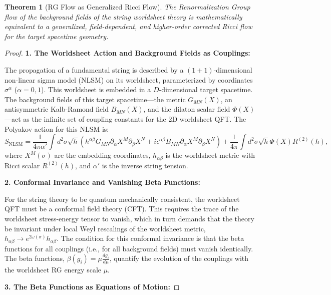 \documentclass[11pt, letterpaper]{report}
\theoremstyle{plain} %
\newtheorem{theorem}{Theorem}[chapter]
\theoremstyle{definition} %
\theoremstyle{remark} %
\begin{document}
\begin{theorem}[RG Flow as Generalized Ricci Flow]
\label{thm:rg_as_ricci}
The Renormalization Group flow of the background fields of the string worldsheet theory is mathematically equivalent to a generalized, field-dependent, and higher-order corrected Ricci flow for the target spacetime geometry.
\end{theorem}
\begin{proof}
\textbf{1. The Worldsheet Action and Background Fields as Couplings:}

The propagation of a fundamental string is described by a $(1+1)$-dimensional non-linear sigma model (NLSM) on its worldsheet, parameterized by coordinates $\sigma^\alpha$ ($\alpha=0,1$). This worldsheet is embedded in a $D$-dimensional target spacetime. The background fields of this target spacetime—the metric $G_{MN}(X)$, an antisymmetric Kalb-Ramond field $B_{MN}(X)$, and the dilaton scalar field $\Phi(X)$—act as the infinite set of coupling constants for the 2D worldsheet QFT. The Polyakov action for this NLSM is:
\begin{equation}
\label{eq:nlsm_action}
S_{\text{NLSM}} = \frac{1}{4\pi\alpha'} \int d^2\sigma \sqrt{h} \left( h^{\alpha\beta} G_{MN}\partial_\alpha X^M \partial_\beta X^N + i\epsilon^{\alpha\beta} B_{MN}\partial_\alpha X^M \partial_\beta X^N \right) + \frac{1}{4\pi}\int d^2\sigma \sqrt{h} \Phi(X) R^{(2)}(h),
\end{equation}
where $X^M(\sigma)$ are the embedding coordinates, $h_{\alpha\beta}$ is the worldsheet metric with Ricci scalar $R^{(2)}(h)$, and $\alpha'$ is the inverse string tension.

\textbf{2. Conformal Invariance and Vanishing Beta Functions:}

For the string theory to be quantum mechanically consistent, the worldsheet QFT must be a conformal field theory (CFT). This requires the trace of the worldsheet stress-energy tensor to vanish, which in turn demands that the theory be invariant under local Weyl rescalings of the worldsheet metric, $h_{\alpha\beta} \to e^{2\omega(\sigma)}h_{\alpha\beta}$. The condition for this conformal invariance is that the beta functions for all couplings (i.e., for all background fields) must vanish identically. The beta functions, $\beta(g_i) = \mu \frac{dg_i}{d\mu}$, quantify the evolution of the couplings with the worldsheet RG energy scale $\mu$.

\textbf{3. The Beta Functions as Equations of Motion:}


\end{proof}
\end{document}
